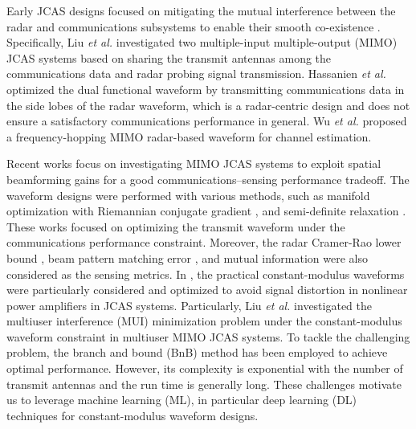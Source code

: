 \documentclass[conference]{IEEEtran}
\begin{document}
Early JCAS designs focused on mitigating the mutual interference between the radar and communications subsystems to enable their smooth co-existence \cite{hassanien2016signaling, hassanien2015dual, liu2020joint, ma2020joint, chiriyath2017radar, zheng2019radar, li2016optimum, martone2019joint, liu2018mu, liu2017robust, buzzi2019using}. Specifically, Liu \textit{et al.} \cite{liu2018mu} investigated two multiple-input multiple-output (MIMO) JCAS systems based on sharing the transmit antennas among the communications data and radar probing signal transmission. Hassanien \textit{et al.} \cite{hassanien2015dual} optimized the dual functional waveform by transmitting communications data in the side lobes of the radar waveform, which is a radar-centric design and does not ensure a satisfactory communications performance in general. Wu \textit{et al.} \cite{wu2020waveform} proposed a frequency-hopping MIMO radar-based waveform for channel estimation.

Recent works focus on investigating MIMO JCAS systems to exploit spatial beamforming gains for a good communications--sensing performance tradeoff. The waveform designs were performed with various methods, such as manifold optimization with Riemannian conjugate gradient \cite{8288677}, and semi-definite relaxation \cite{9124713, 9940478}. These works focused on optimizing the transmit waveform under the communications performance constraint. Moreover, the radar Cramer-Rao lower bound \cite{9468975,9420261}, beam pattern matching error \cite{9104378}, and mutual information \cite{9145467} were also considered as the sensing metrics.  In \cite{liu2018toward, tang2022mimo, wu2023constant, liu2021dual}, the practical constant-modulus waveforms were particularly considered and optimized to avoid signal distortion in nonlinear power amplifiers in JCAS systems. Particularly, Liu \textit{et al.} \cite{liu2018toward} investigated the multiuser interference (MUI) minimization problem under the constant-modulus waveform constraint in multiuser MIMO JCAS systems. To tackle the challenging problem, the branch and bound (BnB) method has been employed to achieve optimal performance. However, its complexity is exponential with the number of transmit antennas and the run time is generally long. These challenges motivate us to leverage machine learning (ML), in particular deep learning (DL) techniques for constant-modulus waveform designs.
\end{document}

